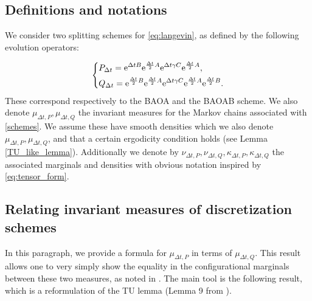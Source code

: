 \subsection{Definitions and notations}\label{defs}
 We consider two splitting schemes for \eqref{eq:langevin}, as defined by the following evolution operators:

\begin{equation}
  \label{schemes}
  \left\{\begin{aligned}
    &P_{\Delta t}=\mathrm{e}^{\Delta t B}\mathrm{e}^{\frac{\Delta t}2A}\mathrm{e}^{\Delta t \gamma C}\mathrm{e}^{\frac{\Delta t}2A},\\
    &Q_{\Delta t}=\mathrm{e}^{\frac{\Delta t}2B}\mathrm{e}^{\frac{\Delta t}2A}\mathrm{e}^{\Delta t \gamma C}\mathrm{e}^{\frac{\Delta t}2A}\mathrm{e}^{\frac{\Delta t}2B}.\\
\end{aligned}\right.
\end{equation}
These correspond respectively to the BAOA and the BAOAB scheme.
We also denote $\mu_{\Delta t,P}, \mu_{\Delta t, Q}$ the invariant measures for the Markov chains associated with \eqref{schemes}. We assume these have smooth densities which we also denote $\mu_{\Delta t,P}, \mu_{\Delta t,Q}$, and that a certain ergodicity condition holds (see Lemma \ref{TU_like_lemma}).
Additionally we denote by $\nu_{\Delta t,P},\nu_{\Delta t,Q},\kappa_{\Delta t,P},\kappa_{\Delta t,Q}$ the associated marginals and densities with obvious notation inspired by \eqref{eq:tensor_form}.


\subsection{Relating invariant measures of discretization schemes}\label{relating invariant measures}
In this paragraph, we provide a formula for $\mu_{\Delta t,P}$ in terms of $\mu_{\Delta t,Q}$. This result allows one to very simply show the equality in the configurational marginals between these two measures, as noted in \cite{KK22}.
The main tool is the following result, which is a reformulation of the TU lemma (Lemma 9 from \cite{LMS13}).

